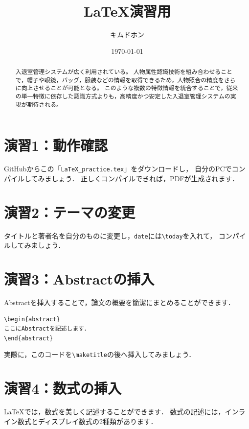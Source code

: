 \documentclass[a4paper,twocolumn]{jsarticle}
\title{%
LaTeX演習用
}
\author{キムドホン}
\date{\today}
\begin{document}
\maketitle

\begin{abstract}
入退室管理システムが広く利用されている。
人物属性認識技術を組み合わせることで，帽子や眼鏡，バッグ，服装などの情報を取得できるため，人物照合の精度をさらに向上させることが可能となる。
このような複数の特徴情報を統合することで，従来の単一特徴に依存した認識方式よりも，高精度かつ安定した入退室管理システムの実現が期待される。
\end{abstract}

\section*{演習1：動作確認}
GitHubからこの「\texttt{LaTeX\_practice.tex}」をダウンロードし，
自分のPCでコンパイルしてみましょう．
正しくコンパイルできれば，PDFが生成されます．

\section*{演習2：テーマの変更}
タイトルと著者名を自分のものに変更し，\texttt{date}には\verb|\today|を入れて，
コンパイルしてみましょう．

\section*{演習3：Abstractの挿入}
Abstractを挿入することで，論文の概要を簡潔にまとめることができます．

\begin{verbatim}
\begin{abstract}
ここにAbstractを記述します．
\end{abstract}
\end{verbatim}

実際に，このコードを\verb|\maketitle|の後へ挿入してみましょう．

\section*{演習4：数式の挿入}
LaTeXでは，数式を美しく記述することができます．
数式の記述には，インライン数式とディスプレイ数式の2種類があります．
\end{document}
